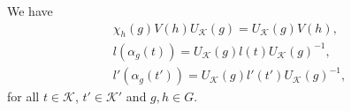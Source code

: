 %
%
%

\noindent\begin{lemma}\label{xVU} We have
\begin{gather}
\chi_h(g)V(h)U_\mathcal{K}(g) = U_\mathcal{K}(g)V(h),\label{UVSymmetry}\\
l(\alpha_g(t)) = U_\mathcal{K}(g)l(t)U_\mathcal{K}(g)^{-1},\label{lGroup}\\
l'(\alpha_g(t')) = U_\mathcal{K}(g)l'(t')U_\mathcal{K}(g)^{-1},\label{lGroupDual}
\end{gather}
\noindent for all $t \in \mathcal{K}$, $t' \in \mathcal{K}'$ and $g, h \in G$.\\
\end{lemma}

